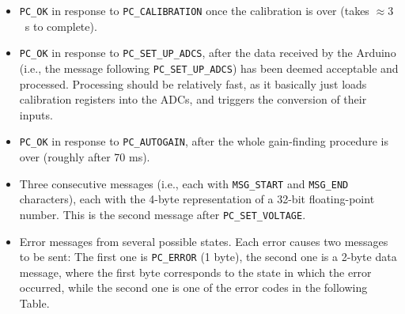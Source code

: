 \documentclass[11pt,a4paper,english]{article}
\begin{document}
\begin{itemize}
\item \texttt{PC\_OK} in response to \texttt{PC\_CALIBRATION} once the calibration is over (takes $\approx3$~s to complete).
\item \texttt{PC\_OK} in response to \texttt{PC\_SET\_UP\_ADCS}, after the data received by the Arduino (i.e., the message following \texttt{PC\_SET\_UP\_ADCS}) has been deemed acceptable and processed. Processing should be relatively fast, as it basically just loads calibration registers into the ADCs, and triggers the conversion of their inputs.
\item \texttt{PC\_OK} in response to \texttt{PC\_AUTOGAIN}, after the whole gain-finding procedure is over (roughly after 70 ms).
\item Three consecutive messages (i.e., each with \texttt{MSG\_START} and \texttt{MSG\_END} characters), each with the 4-byte representation of a 32-bit floating-point number. This is the second message after \texttt{PC\_SET\_VOLTAGE}.
\item Error messages from several possible states. Each error causes two messages to be sent: The first one is \texttt{PC\_ERROR} (1 byte), the second one is a 2-byte data message, where the first byte corresponds to the state in which the error occurred, while the second one is one of the error codes in the following Table.


\end{itemize}
\end{document}
